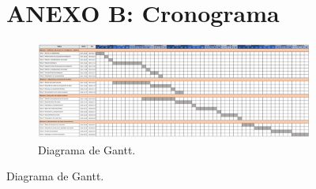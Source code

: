 \begin{figure}

\renewcommand\thefigure{B.\arabic{figure}}  
\setcounter{figure}{0} 

\section*{ANEXO B: Cronograma}
{}

\begin{figure}[H]
  \centering
  \includegraphics[width = 22cm]{E_IMAGENES/Anexos/gantt}
  \caption{Diagrama de Gantt.}
  \label{fig:cronograma}
\end{figure}

\end{figure}
